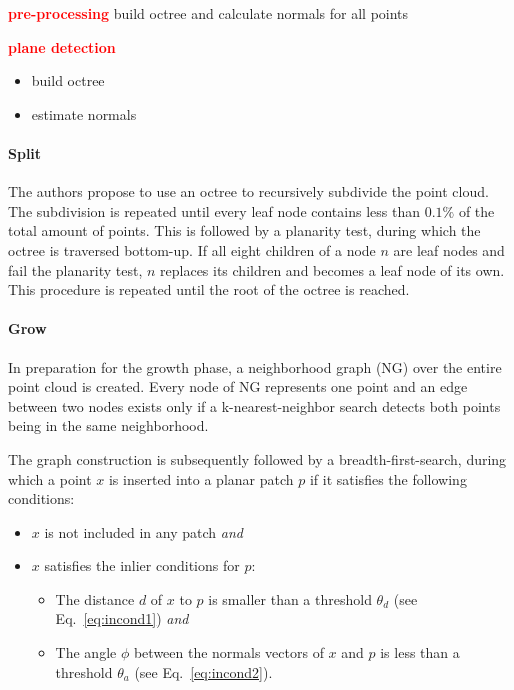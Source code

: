 \documentclass[main.tex]{subfiles}
\begin{document}
\textbf{\textcolor{red}{pre-processing}}
build octree and calculate normals for all points

\textbf{\textcolor{red}{plane detection}}
\begin{itemize}
    \item build octree
    \item estimate normals
\end{itemize}
\paragraph*{Split}
The authors propose to use an octree to recursively subdivide the point cloud. The subdivision is repeated until every leaf node contains less than $0.1\%$ of the total amount
of points.
This is followed by a planarity test, during which the octree is traversed bottom-up. If all eight children of a node $n$ are leaf nodes and fail the planarity test, $n$ replaces its children
and becomes a leaf node of its own. This procedure is repeated until the root of the octree is reached.

\paragraph*{Grow}
In preparation for the growth phase, a neighborhood graph (NG) over the entire point cloud is created. Every node of NG represents one point and an edge between two nodes exists only if
a k-nearest-neighbor search detects both points being in the same neighborhood.

The graph construction is subsequently followed by a breadth-first-search, during which a point $x$ is inserted into a planar patch $p$ if it satisfies the following conditions:
\begin{itemize}
    \item $x$ is not included in any patch \textit{and}
    \item $x$ satisfies the inlier conditions for $p$: %
          \begin{itemize}
              \item The distance $d$ of $x$ to $p$ is smaller than a threshold $\theta_d$ (see Eq.~\ref{eq:incond1}) \textit{and} %
              \item The angle $\phi$ between the normals vectors of $x$ and $p$ is less than a threshold $\theta_a$ (see Eq.~\ref{eq:incond2}). %
          \end{itemize}
\end{itemize}
\end{document}

